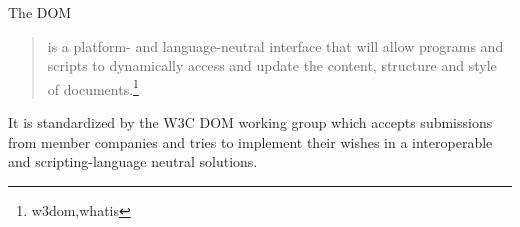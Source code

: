 The DOM 
\begin{quotation}
	is a platform- and language-neutral interface that will allow programs and scripts to dynamically access and update the content, structure and style of documents.\footnote{w3dom,whatis}
\end{quotation}

It is standardized by the W3C DOM working group which accepts submissions from member companies and tries to implement their wishes in a interoperable and scripting-language neutral solutions.
